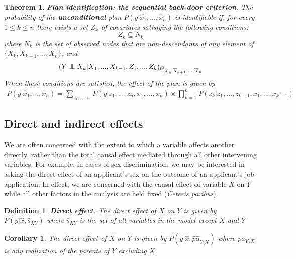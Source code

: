 \documentclass[11pt]{article}
\numberwithin{equation}{section}
\newcommand\indep{\protect\mathpalette{\protect\independenT}{\perp}}
\def\independenT#1#2{\mathrel{\rlap{$#1#2$}\mkern2mu{#1#2}}}
\newtheorem{thm}{Theorem}[section]
\newtheorem{defn}{Definition}[section]
\newtheorem{cor}{Corollary}[section]
\begin{document}
\begin{thm}
\textbf{Plan identification: the sequential back-door criterion}. The probability of the \textbf{unconditional} plan $P(y|\hat{x_1}, ..., \hat{x}_n)$ is identifiable if, for every $1 \leq k \leq n$ there exists a set $Z_k$ of covariates satisfying the following conditions:
\begin{equation}
Z_k \subseteq N_k
\end{equation}
where $N_k$ is the set of observed nodes that are non-descendants of any element of $\{X_k, X_{k+1},...,X_n\}$, and
\begin{align}
(Y \indep X_k | X_1,...,X_{k-1},Z_1,...,Z_k)_{{G_{\underline{X}_k,\overline{X}_{k+1},...,\overline{X}_{n}}}}
\end{align}
When these conditions are satisfied, the effect of the plan is given by
\begin{align}
P(y|\hat{x}_1,...,\hat{x}_n) = \sum_{z_1,...,z_n} P(y|z_1,...,z_n,x_1,...,x_n) \times \prod_{k=1}^n P(z_k|z_1,...,z_{k-1},x_1,...,x_{k-1})
\end{align}
\end{thm}

\subsection{Direct and indirect effects}

We are often concerned with the extent to which a variable affects another directly, rather than the total causal effect mediated through all other intervening variables. For example, in cases of sex discrimination, we may be interested in asking the direct effect of an applicant's sex on the outcome of an applicant's job application. In effect, we are concerned with the causal effect of variable $X$ on $Y$ while all other factors in the analysis are held fixed (\textit{Ceteris paribus}).

\begin{defn}
\textbf{Direct effect}. The direct effect of $X$ on $Y$ is given by $P(y|\hat{x},\hat{s}_{XY})$ where $\hat{s}_{XY}$ is the set of all variables in the model except $X$ and $Y$
\end{defn}

\begin{cor}
The direct effect of $X$ on $Y$ is given by $P(y|\hat{x}, \hat{pa}_{Y \setminus X})$ where $pa_{Y \setminus X}$ is any realization of the parents of $Y$ excluding $X$.
\end{cor}
\end{document}

